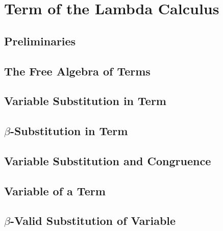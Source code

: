 \section{Term of the Lambda Calculus}
    \subsection{Preliminaries}
        
    \subsection{The Free Algebra of Terms}
        
    \subsection{Variable Substitution in Term}
        
    \subsection{$\beta$-Substitution in Term}
        
    \subsection{Variable Substitution and Congruence}
        
    \subsection{Variable of a Term}
        
    \subsection{$\beta$-Valid Substitution of Variable}
        

